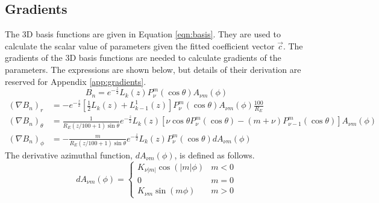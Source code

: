 \documentclass[12pt,letterpaper]{article}
\begin{document}
  \subsection{Gradients}
  The 3D basis functions are given in Equation \ref{eqn:basis}.  They are used to calculate the scalar value of parameters given the fitted coefficient vector \(\vec{c}\).  The gradients of the 3D basis functions are needed to calculate gradients of the parameters.  The expressions are shown below, but details of their derivation are reserved for Appendix \ref{app:gradients}.
  \begin{equation}
    B_n = e^{-\frac{z}{2}}L_k(z)P_\nu^m(\cos\theta)A_{\nu m}(\phi)
  \end{equation}
  \begin{align}
    (\nabla B_n)_r &= -e^{-\frac{z}{2}}\left[\frac{1}{2}L_k(z)+L_{k-1}^1(z)\right]P_\nu^m(\cos\theta)A_{\nu m}(\phi)\frac{100}{R_E} \\
    (\nabla B_n)_\theta &= \frac{1}{R_E(z/100+1)\sin\theta}e^{-\frac{z}{2}}L_k(z)\left[\nu\cos\theta P_\nu^m(\cos\theta)-(m+\nu)P_{\nu-1}^m(\cos\theta)\right]A_{\nu m}(\phi) \\
    (\nabla B_n)_\phi &= -\frac{m}{R_E(z/100+1)\sin\theta}e^{-\frac{z}{2}}L_k(z)P_\nu^m(\cos\theta)dA_{\nu m}(\phi)
  \end{align}
  The derivative azimuthal function, \(dA_{\nu m}(\phi)\), is defined as follows.
  \begin{equation}
    \label{eqn:dA}
    dA_{\nu m}(\phi) = \begin{cases}
                        K_{\nu |m|}\cos(|m|\phi) & m < 0 \\
                        0 & m = 0 \\
                        K_{\nu m}\sin(m\phi) & m > 0
                      \end{cases}
  \end{equation}
\end{document}
